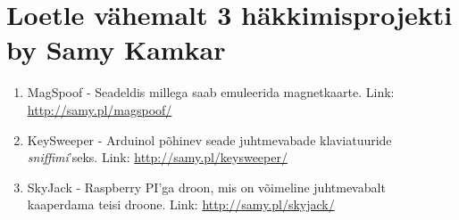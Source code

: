 \documentclass{article}
\begin{document}
\section{Loetle vähemalt 3 häkkimisprojekti by Samy Kamkar}
\begin{enumerate}
	\item{MagSpoof - Seadeldis millega saab emuleerida magnetkaarte. Link: \url{http://samy.pl/magspoof/}}
	\item{KeySweeper - Arduinol põhinev seade juhtmevabade klaviatuuride \textit{sniffimi}'seks. Link: \url{http://samy.pl/keysweeper/}}
	\item{SkyJack - Raspberry PI'ga droon, mis on võimeline juhtmevabalt kaaperdama teisi droone. Link: \url{http://samy.pl/skyjack/}}
\end{enumerate}
\end{document}
